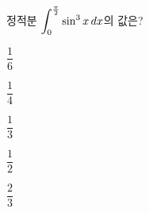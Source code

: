\hspace*{2mm}\begin{minipage}[t]{\dimexpr\linewidth-2mm\relax}\vspace{0pt}
정적분 $\displaystyle\int_{0}^{\frac{\pi}{2}}\sin^3 x\mkern3mu dx$의 값은?
\begin{choices32}{\rule[-3ex]{0pt}{8ex}$\dfrac{1}{6}$}{\rule[-3ex]{0pt}{8ex}$\dfrac{1}{4}$}{\rule[-3ex]{0pt}{8ex}$\dfrac{1}{3}$}{\rule[-3ex]{0pt}{8ex}$\dfrac{1}{2}$}{\rule[-3ex]{0pt}{8ex}$\dfrac{2}{3}$}\end{choices32}\end{minipage}
